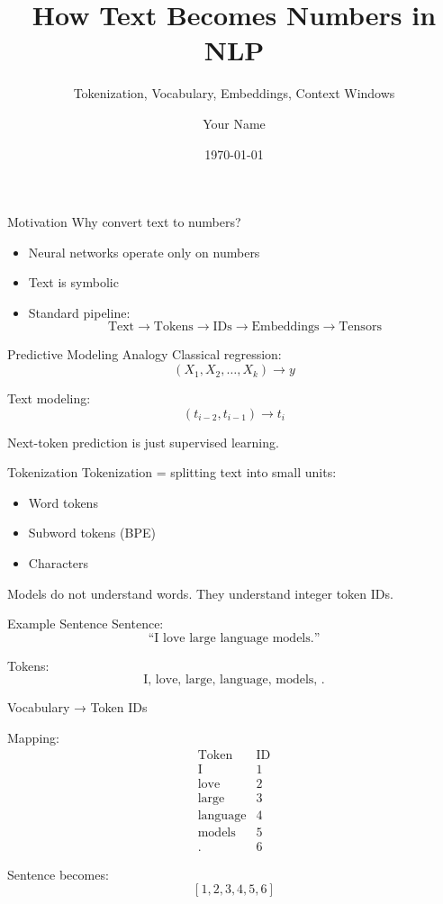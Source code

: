 \documentclass{beamer}
\title{How Text Becomes Numbers in NLP}
\subtitle{Tokenization, Vocabulary, Embeddings, Context Windows}
\author{Your Name}
\date{\today}
\begin{document}
\frame{\titlepage}

\begin{frame}{Motivation}
Why convert text to numbers?
\begin{itemize}
    \item Neural networks operate only on numbers
    \item Text is symbolic
    \item Standard pipeline:
\[
\text{Text} \rightarrow \text{Tokens} \rightarrow \text{IDs} \rightarrow \text{Embeddings} \rightarrow \text{Tensors}
\]
\end{itemize}
\end{frame}

\begin{frame}{Predictive Modeling Analogy}
Classical regression:
\[
(X_1, X_2, \dots, X_k) \rightarrow y
\]

Text modeling:
\[
(t_{i-2}, t_{i-1}) \rightarrow t_i
\]

Next-token prediction is just supervised learning.
\end{frame}

\begin{frame}{Tokenization}
Tokenization = splitting text into small units:
\begin{itemize}
    \item Word tokens
    \item Subword tokens (BPE)
    \item Characters
\end{itemize}

Models do not understand words.  
They understand integer token IDs.
\end{frame}

\begin{frame}{Example Sentence}
Sentence:
\[
\text{``I love large language models.''}
\]

Tokens:
\[
\text{I, love, large, language, models, .}
\]
\end{frame}

\begin{frame}{Vocabulary → Token IDs}

Mapping:
\[
\begin{array}{c|c}
\text{Token} & \text{ID} \\
\hline
\text{I} & 1 \\
\text{love} & 2 \\
\text{large} & 3 \\
\text{language} & 4 \\
\text{models} & 5 \\
\text{.} & 6
\end{array}
\]

Sentence becomes:
\[
[1, 2, 3, 4, 5, 6]
\]
\end{frame}
\end{document}
